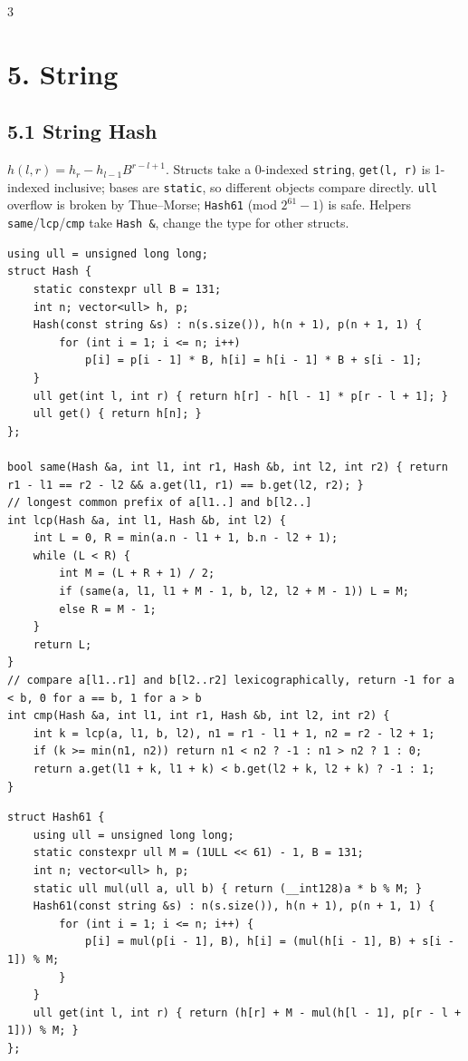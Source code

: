 \documentclass[8pt]{extarticle}
\begin{document}
\begin{multicols*}{3}
\section*{5. String}

\subsection*{5.1 String Hash}

$h(l, r) = h_r - h_{l-1} B^{r-l+1}$. Structs take a 0-indexed \texttt{string}, \texttt{get(l, r)} is 1-indexed inclusive; bases are \texttt{static}, so different objects compare directly. \texttt{ull} overflow is broken by Thue--Morse; \texttt{Hash61} (mod $2^{61}-1$) is safe. Helpers \texttt{same}/\texttt{lcp}/\texttt{cmp} take \texttt{Hash \&}, change the type for other structs.


\begin{lstlisting}
using ull = unsigned long long;
struct Hash {
    static constexpr ull B = 131;
    int n; vector<ull> h, p;
    Hash(const string &s) : n(s.size()), h(n + 1), p(n + 1, 1) {
        for (int i = 1; i <= n; i++)
            p[i] = p[i - 1] * B, h[i] = h[i - 1] * B + s[i - 1];
    }
    ull get(int l, int r) { return h[r] - h[l - 1] * p[r - l + 1]; }
    ull get() { return h[n]; }
};

bool same(Hash &a, int l1, int r1, Hash &b, int l2, int r2) { return r1 - l1 == r2 - l2 && a.get(l1, r1) == b.get(l2, r2); }
// longest common prefix of a[l1..] and b[l2..]
int lcp(Hash &a, int l1, Hash &b, int l2) {
    int L = 0, R = min(a.n - l1 + 1, b.n - l2 + 1);
    while (L < R) {
        int M = (L + R + 1) / 2;
        if (same(a, l1, l1 + M - 1, b, l2, l2 + M - 1)) L = M;
        else R = M - 1;
    }
    return L;
}
// compare a[l1..r1] and b[l2..r2] lexicographically, return -1 for a < b, 0 for a == b, 1 for a > b
int cmp(Hash &a, int l1, int r1, Hash &b, int l2, int r2) {
    int k = lcp(a, l1, b, l2), n1 = r1 - l1 + 1, n2 = r2 - l2 + 1;
    if (k >= min(n1, n2)) return n1 < n2 ? -1 : n1 > n2 ? 1 : 0;
    return a.get(l1 + k, l1 + k) < b.get(l2 + k, l2 + k) ? -1 : 1;
}
\end{lstlisting}

\begin{lstlisting}
struct Hash61 {
    using ull = unsigned long long;
    static constexpr ull M = (1ULL << 61) - 1, B = 131;
    int n; vector<ull> h, p;
    static ull mul(ull a, ull b) { return (__int128)a * b % M; }
    Hash61(const string &s) : n(s.size()), h(n + 1), p(n + 1, 1) {
        for (int i = 1; i <= n; i++) {
            p[i] = mul(p[i - 1], B), h[i] = (mul(h[i - 1], B) + s[i - 1]) % M;
        }
    }
    ull get(int l, int r) { return (h[r] + M - mul(h[l - 1], p[r - l + 1])) % M; }
};
\end{lstlisting}


\end{multicols*}
\end{document}
